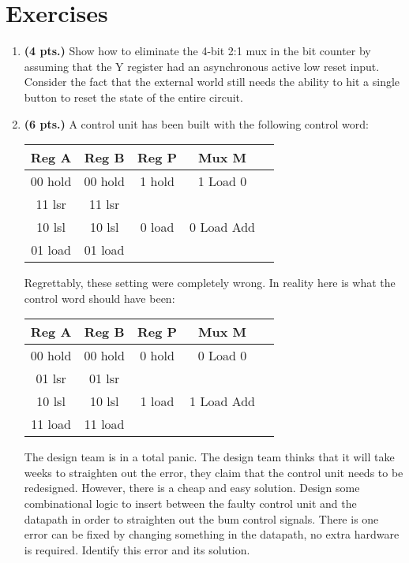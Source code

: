 \section{Exercises}
\label{section:datapathControl}
\graphicspath{ {./chapter08/FigHw} }

\begin{enumerate}
    \item \textbf{ (4 pts.)}
        Show how to eliminate the 4-bit 2:1 mux in the bit counter by assuming
        that the Y register had an asynchronous active low reset input. Consider
        the fact that the external world still needs the ability to hit a single
        button to reset the state of the entire circuit.

    \item  \textbf{ (6 pts.)}
        A control unit has been built with the following control word:

        \begin{tabular}{|c|c|c|c|c|}  \hline
            Reg A   & Reg B   & Reg P  & Mux M      \\ \hline
            00 hold & 00 hold & 1 hold & 1 Load 0   \\ \hline
            11 lsr  & 11 lsr  &        &            \\ \hline
            10 lsl  & 10 lsl  & 0 load & 0 Load Add \\ \hline
            01 load & 01 load &        &            \\ \hline
        \end{tabular}

        Regrettably, these setting were completely wrong.  In reality here is what the control word should
        have been:

        \begin{tabular}{|c|c|c|c|c|}  \hline
            Reg A   & Reg B   & Reg P  & Mux M      \\ \hline
            00 hold & 00 hold & 0 hold & 0 Load 0   \\ \hline
            01 lsr  & 01 lsr  &        &            \\ \hline
            10 lsl  & 10 lsl  & 1 load & 1 Load Add \\ \hline
            11 load & 11 load &        &            \\ \hline
        \end{tabular}

        The design team is in a total panic.
        The design team thinks that it will take weeks to straighten out the error,
        they claim that the control unit needs to be redesigned.  However, there is
        a cheap and easy solution.  Design some combinational
        logic to insert between the faulty control unit and the datapath in order
        to straighten out the bum control signals.  There is one error can be
        fixed by changing something in the datapath, no extra hardware is
        required.  Identify this error and its solution.


\end{enumerate}
